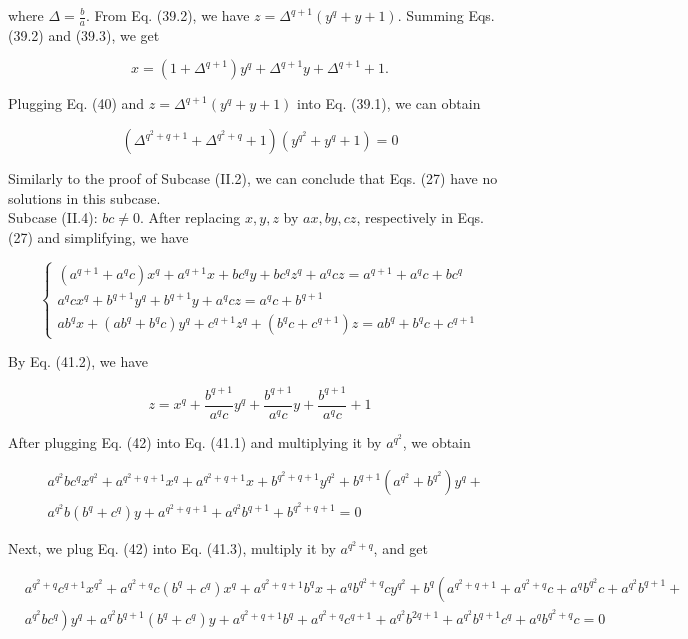 \documentclass[10pt]{article}
\begin{document}
where $\Delta=\frac{b}{a}$. From Eq. (39.2), we have $z=\Delta^{q+1}\left(y^{q}+y+1\right)$. Summing Eqs. (39.2) and (39.3), we get


\begin{equation*}
x=\left(1+\Delta^{q+1}\right) y^{q}+\Delta^{q+1} y+\Delta^{q+1}+1 . \tag{40}
\end{equation*}


Plugging Eq. (40) and $z=\Delta^{q+1}\left(y^{q}+y+1\right)$ into Eq. (39.1), we can obtain

$$
\left(\Delta^{q^{2}+q+1}+\Delta^{q^{2}+q}+1\right)\left(y^{q^{2}}+y^{q}+1\right)=0
$$

Similarly to the proof of Subcase (II.2), we can conclude that Eqs. (27) have no solutions in this subcase.\\
Subcase (II.4): $b c \neq 0$. After replacing $x, y, z$ by $a x, b y, c z$, respectively in Eqs. (27) and simplifying, we have

\[
\left\{\begin{array}{l}
\left(a^{q+1}+a^{q} c\right) x^{q}+a^{q+1} x+b c^{q} y+b c^{q} z^{q}+a^{q} c z=a^{q+1}+a^{q} c+b c^{q}  \tag{41.1}\\
a^{q} c x^{q}+b^{q+1} y^{q}+b^{q+1} y+a^{q} c z=a^{q} c+b^{q+1} \\
a b^{q} x+\left(a b^{q}+b^{q} c\right) y^{q}+c^{q+1} z^{q}+\left(b^{q} c+c^{q+1}\right) z=a b^{q}+b^{q} c+c^{q+1}
\end{array}\right.
\]

By Eq. (41.2), we have


\begin{equation*}
z=x^{q}+\frac{b^{q+1}}{a^{q} c} y^{q}+\frac{b^{q+1}}{a^{q} c} y+\frac{b^{q+1}}{a^{q} c}+1 \tag{42}
\end{equation*}


After plugging Eq. (42) into Eq. (41.1) and multiplying it by $a^{q^{2}}$, we obtain


\begin{align*}
& a^{q^{2}} b c^{q} x^{q^{2}}+a^{q^{2}+q+1} x^{q}+a^{q^{2}+q+1} x+b^{q^{2}+q+1} y^{q^{2}}+b^{q+1}\left(a^{q^{2}}+b^{q^{2}}\right) y^{q}+ \\
& a^{q^{2}} b\left(b^{q}+c^{q}\right) y+a^{q^{2}+q+1}+a^{q^{2}} b^{q+1}+b^{q^{2}+q+1}=0 \tag{43}
\end{align*}


Next, we plug Eq. (42) into Eq. (41.3), multiply it by $a^{q^{2}+q}$, and get


\begin{align*}
& a^{q^{2}+q} c^{q+1} x^{q^{2}}+a^{q^{2}+q} c\left(b^{q}+c^{q}\right) x^{q}+a^{q^{2}+q+1} b^{q} x+a^{q} b^{q^{2}+q} c y^{q^{2}}+b^{q}\left(a^{q^{2}+q+1}+a^{q^{2}+q} c+a^{q} b^{q^{2}} c+a^{q^{2}} b^{q+1}+\right. \\
& \left.a^{q^{2}} b c^{q}\right) y^{q}+a^{q^{2}} b^{q+1}\left(b^{q}+c^{q}\right) y+a^{q^{2}+q+1} b^{q}+a^{q^{2}+q} c^{q+1}+a^{q^{2}} b^{2 q+1}+a^{q^{2}} b^{q+1} c^{q}+a^{q} b^{q^{2}+q} c=0 \tag{44}
\end{align*}
\end{document}
